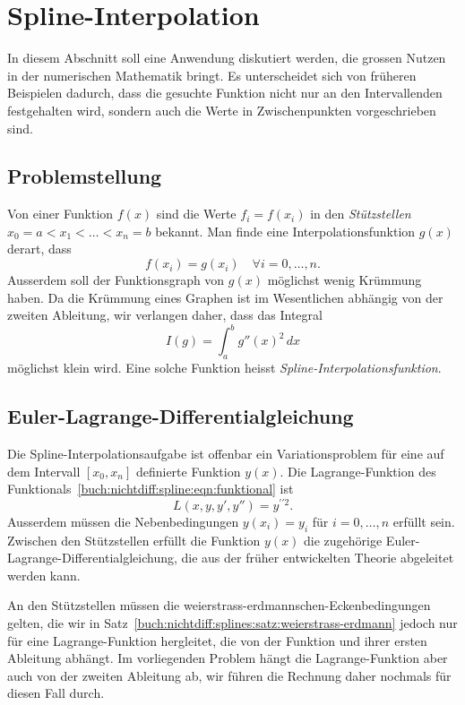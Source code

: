 %
%
%
\section{Spline-Interpolation
\label{buch:nichtdiff:section:splines}}
In diesem Abschnitt soll eine Anwendung diskutiert werden, die grossen
Nutzen in der numerischen Mathematik bringt.
Es unterscheidet sich von früheren Beispielen dadurch, dass die
gesuchte Funktion nicht nur an den Intervallenden festgehalten wird,
sondern auch die Werte in Zwischenpunkten vorgeschrieben sind.

%
%
\subsection{Problemstellung}
Von einer Funktion $f(x)$ sind die Werte 
$f_i=f(x_i)$ in den {\em Stützstellen} $x_0=a<x_1<\dots<x_n=b$ bekannt.
%
Man finde eine Interpolationsfunktion $g(x)$ derart, dass
\[
f(x_i) = g(x_i)
\quad
\forall i=0,\dots,n.
\]
Ausserdem soll der Funktionsgraph von $g(x)$ möglichst wenig Krümmung haben.
Da die Krümmung eines Graphen ist im Wesentlichen abhängig von der zweiten
Ableitung, wir verlangen daher, dass das Integral
\begin{equation}
I(g)
=
\int_a^b g''(x)^2\,dx
\label{buch:nichtdiff:spline:eqn:funktional}
\end{equation}
möglichst klein wird.
Eine solche Funktion heisst {\em Spline-Interpolationsfunktion}.
%

%
%
\subsection{Euler-Lagrange-Differentialgleichung}
Die Spline-Interpolationsaufgabe ist offenbar ein Variationsproblem
für eine auf dem Intervall $[x_0,x_n]$ definierte Funktion $y(x)$.
Die Lagrange-Funktion des
Funktionals~\eqref{buch:nichtdiff:spline:eqn:funktional} ist
\[
L(x,y,y',y'') = y^{\prime\prime 2}.
\]
Ausserdem müssen die Nebenbedingungen $y(x_i)=y_i$ für $i=0,\dots,n$
erfüllt sein.
Zwischen den Stützstellen erfüllt die Funktion $y(x)$ die zugehörige
Euler-Lagrange-Differentialgleichung, die aus der früher entwickelten
Theorie abgeleitet werden kann.

An den Stützstellen müssen die weierstrass-erdmannschen-Eckenbedingungen
gelten, die wir in Satz~\ref{buch:nichtdiff:splines:satz:weierstrass-erdmann}
jedoch nur für eine Lagrange-Funktion hergleitet, die von der Funktion
und ihrer ersten Ableitung abhängt.
Im vorliegenden Problem hängt die Lagrange-Funktion aber auch von der
zweiten Ableitung ab, wir führen die Rechnung daher nochmals für diesen
Fall durch.

